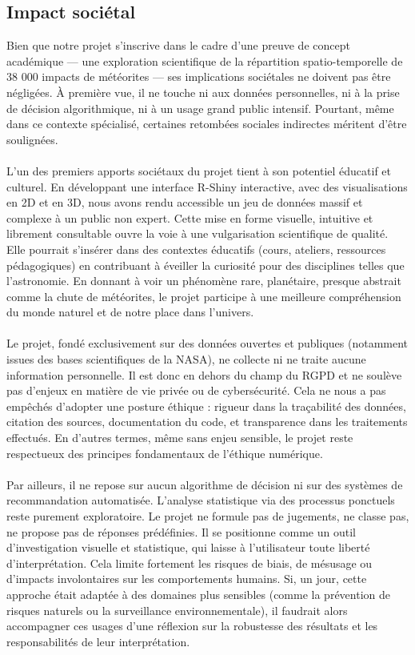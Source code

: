 \documentclass[12pt]{article}
\begin{document}
\subsection{Impact sociétal}
Bien que notre projet s’inscrive dans le cadre d’une preuve de concept académique — une exploration scientifique de la répartition spatio-temporelle de 38 000 impacts de météorites — ses implications sociétales ne doivent pas être négligées. À première vue, il ne touche ni aux données personnelles, ni à la prise de décision algorithmique, ni à un usage grand public intensif. Pourtant, même dans ce contexte spécialisé, certaines retombées sociales indirectes méritent d’être soulignées.\\
\\
L’un des premiers apports sociétaux du projet tient à son potentiel éducatif et culturel. En développant une interface R-Shiny interactive, avec des visualisations en 2D et en 3D, nous avons rendu accessible un jeu de données massif et complexe à un public non expert. Cette mise en forme visuelle, intuitive et librement consultable ouvre la voie à une vulgarisation scientifique de qualité. Elle pourrait s’insérer dans des contextes éducatifs (cours, ateliers, ressources pédagogiques) en contribuant à éveiller la curiosité pour des disciplines telles que l’astronomie. En donnant à voir un phénomène rare, planétaire, presque abstrait comme la chute de météorites, le projet participe à une meilleure compréhension du monde naturel et de notre place dans l’univers.\\
\\
Le projet, fondé exclusivement sur des données ouvertes et publiques (notamment issues des bases scientifiques de la NASA), ne collecte ni ne traite aucune information personnelle. Il est donc en dehors du champ du RGPD et ne soulève pas d’enjeux en matière de vie privée ou de cybersécurité. Cela ne nous a pas empêchés d’adopter une posture éthique : rigueur dans la traçabilité des données, citation des sources, documentation du code, et transparence dans les traitements effectués. En d’autres termes, même sans enjeu sensible, le projet reste respectueux des principes fondamentaux de l’éthique numérique.\\
\\
Par ailleurs, il ne repose sur aucun algorithme de décision ni sur des systèmes de recommandation automatisée. L’analyse statistique via des processus ponctuels reste purement exploratoire. Le projet ne formule pas de jugements, ne classe pas, ne propose pas de réponses prédéfinies. Il se positionne comme un outil d’investigation visuelle et statistique, qui laisse à l’utilisateur toute liberté d’interprétation. Cela limite fortement les risques de biais, de mésusage ou d’impacts involontaires sur les comportements humains. Si, un jour, cette approche était adaptée à des domaines plus sensibles (comme la prévention de risques naturels ou la surveillance environnementale), il faudrait alors accompagner ces usages d’une réflexion sur la robustesse des résultats et les responsabilités de leur interprétation.\\
\end{document}
